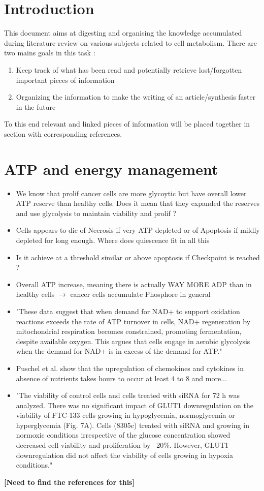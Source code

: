 \documentclass[11pt,a4paper]{article}
\begin{document}
\tableofcontents

\section{Introduction}
This document aims at digesting and organising the knowledge accumulated during literature review on various subjects related to cell metabolism. There are two mains goals in this task : 
\begin{enumerate}
\item Keep track of what has been read and potentially retrieve lost/forgotten important pieces of information
\item Organizing the information to make the writing of an article/synthesis faster in the future
\end{enumerate}
To this end relevant and linked pieces of information will be placed together in section with corresponding references.


\section{ATP and energy management}
\begin{itemize}
\item We know that prolif cancer cells are more glycoytic but have overall lower ATP reserve than healthy cells. Does it mean that they expanded the reserves and use glycolysis to maintain viability and prolif ? 
\item Cells appears to die of Necrosis if very ATP depleted or of Apoptosis if mildly depleted for long enough.  Where does quiescence fit in all this 
\item Is it achieve at a threshold similar or above apoptosis if Checkpoint is reached ? 
\item Overall ATP increase, meaning there is actually WAY MORE ADP than in healthy cells $\rightarrow$ cancer cells accumulate Phosphore in general
\item "These data suggest that when demand for NAD+ to support oxidation reactions exceeds the rate of ATP turnover in cells, NAD+ regeneration by mitochondrial respiration becomes constrained, promoting fermentation, despite available oxygen. This argues that cells engage in aerobic glycolysis when the demand for NAD+ is in excess of the demand for ATP."\cite{Luengo2020}
\item Puschel et al. show that the upregulation of chemokines and cytokines in absence of nutrients takes hours to occur at least 4 to 8 and more... \cite{Puschel2020}

\item "The viability of control cells and cells treated with siRNA for 72 h was analyzed. There was no significant impact of GLUT1 downregulation on the viability of FTC-133 cells growing in hypoglycemia, normoglycemia or hyperglycemia (Fig. 7A). Cells (8305c) treated with siRNA and growing in normoxic conditions irrespective of the glucose concentration showed decreased cell viability and proliferation by ~20\%. However, GLUT1 downregulation did not affect the viability of cells growing in hypoxia conditions."\cite{Jozwiak2014}
\end{itemize}
\textbf{[Need to find the references for this]}
\end{document}
